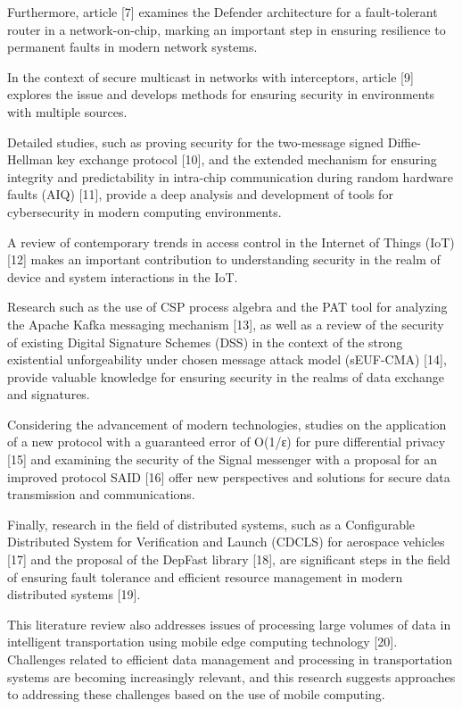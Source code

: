 \begin{multicols}{2}
Furthermore, article {[}7{]} examines the Defender architecture for a
fault-tolerant router in a network-on-chip, marking an important step in
ensuring resilience to permanent faults in modern network systems.

In the context of secure multicast in networks with interceptors,
article {[}9{]} explores the issue and develops methods for ensuring
security in environments with multiple sources.

Detailed studies, such as proving security for the two-message signed
Diffie-Hellman key exchange protocol {[}10{]}, and the extended
mechanism for ensuring integrity and predictability in intra-chip
communication during random hardware faults (AIQ) {[}11{]}, provide a
deep analysis and development of tools for cybersecurity in modern
computing environments.

A review of contemporary trends in access control in the Internet of
Things (IoT) {[}12{]} makes an important contribution to understanding
security in the realm of device and system interactions in the IoT.

Research such as the use of CSP process algebra and the PAT tool for
analyzing the Apache Kafka messaging mechanism {[}13{]}, as well as a
review of the security of existing Digital Signature Schemes (DSS) in
the context of the strong existential unforgeability under chosen
message attack model (sEUF-CMA) {[}14{]}, provide valuable knowledge for
ensuring security in the realms of data exchange and signatures.

Considering the advancement of modern technologies, studies on the
application of a new protocol with a guaranteed error of O(1/ε) for pure
differential privacy {[}15{]} and examining the security of the Signal
messenger with a proposal for an improved protocol SAID {[}16{]} offer
new perspectives and solutions for secure data transmission and
communications.

Finally, research in the field of distributed systems, such as a
Configurable Distributed System for Verification and Launch (CDCLS) for
aerospace vehicles {[}17{]} and the proposal of the DepFast library
{[}18{]}, are significant steps in the field of ensuring fault tolerance
and efficient resource management in modern distributed systems
{[}19{]}.

This literature review also addresses issues of processing large volumes
of data in intelligent transportation using mobile edge computing
technology {[}20{]}. Challenges related to efficient data management and
processing in transportation systems are becoming increasingly relevant,
and this research suggests approaches to addressing these challenges
based on the use of mobile computing.


\end{multicols}
